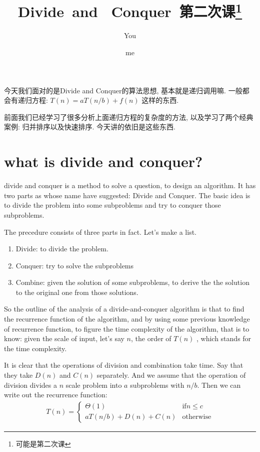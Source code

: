 \documentclass[a4paper, 10pt]{ctexart} %
\title{Divide\ and \ Conquer\ 第二次课\thanks{可能是第二次课}}
\author{You \and me}
\begin{document}
\maketitle
\tableofcontents
今天我们面对的是Divide and Conquer的算法思想, 基本就是递归调用嘛.
一般都会有递归方程: $T\left(n\right) = a T\left(n / b\right) + f\left(n\right)$
这样的东西. 

前面我们已经学习了很多分析上面递归方程的复杂度的方法, 以及学习了两个经典案例: 归并排序以及快速排序. 今天讲的依旧是这些东西.


\section{what is divide and conquer?}
divide and conquer is a method to solve a question, to design an algorithm.
It has two parts as whose name have suggested: Divide and Conquer. The basic idea is to divide the problem into some subproblems and try to conquer those 
subproblems. 

The precedure consists of three parts in fact. Let's make a list.

\begin{enumerate}
    \item Divide: to divide the problem.
    \item Conquer: try to solve the subproblems
    \item Combine: given the solution of some subproblems, to derive the 
    the solution to the original one from those solutions.
\end{enumerate}

So the outline of the analysis of a divide-and-conquer algorithm is that to find the recurrence function of 
the algorithm, and by using some previous knowledge of recurrence function, to figure the time complexity of the 
algorithm, that is to know: given the scale of input, let's say $n$, the order of $T(n)$ , which stands for 
the time complexity.

It is clear that the operations of division and combination take time. Say that they take $D\left(n\right)$ and $C \left(n\right)$ 
separately. And we assume that the operation of division divides a $n$ scale problem into $a$ subproblems with $n  / b$. Then we can write out 
the recurrence function:
\begin{align*}
    T\left(n\right) = 
    \begin{cases}
        \Theta \left(1\right)  & \text{if} n \le c\\
        a T\left( n  / b \right) + D\left(n\right) + C\left(n\right)&  \text{otherwise}
    \end{cases}
\end{align*}
\end{document}
